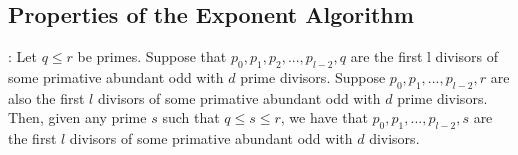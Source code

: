 \documentclass[../paper.tex]{subfiles}
\begin{document}
\subsection{Properties of the Exponent Algorithm}

\begin{theorem}[Property 1]

\end{theorem}

\begin{conj}:
Let $q \leq r$ be primes. Suppose that $p_0, p_1, p_2, ..., 
p_{l-2}, q$ are the first l divisors of some primative abundant
odd with $d$ prime divisors. Suppose $p_0, p_1, ..., p_{l-2},r$ 
are also the first $l$ divisors of some primative abundant odd
with $d$ prime divisors. Then, given any prime $s$ such that $q \leq s 
\leq r$, we have that $p_0, p_1,..., p_{l-2}, s$ are the first $l$
divisors of some primative abundant odd with $d$ divisors.
\end{conj}
\end{document}

